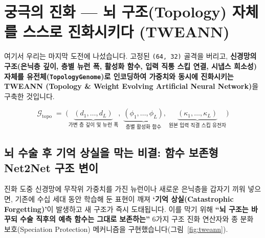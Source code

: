 \documentclass[11pt,a4paper]{article}
\begin{document}
\section{궁극의 진화 --- 뇌 구조(Topology) 자체를 스스로 진화시키다 (TWEANN)}

여기서 우리는 마지막 도전에 나섰습니다. 고정된 \texttt{(64, 32)} 골격을 버리고, \textbf{신경망의 구조(은닉층 깊이, 층별 뉴런 폭, 활성화 함수, 입력 직통 스킵 연결, 시냅스 희소성) 자체를 유전체(\texttt{TopologyGenome})로 인코딩하여 가중치와 동시에 진화시키는 TWEANN (Topology \& Weight Evolving Artificial Neural Network)}을 구축한 것입니다.

\begin{equation}
  \mathcal{G}_{\text{topo}} \;=\; \Big(\underbrace{(d_1, \dots, d_L)}_{\text{가변 층 깊이 및 뉴런 폭}},\; \underbrace{(\phi_1, \dots, \phi_L)}_{\text{층별 활성화 함수}},\; \underbrace{(\kappa_1, \dots, \kappa_L)}_{\text{원본 입력 직결 스킵 유전자}}\Big)
\end{equation}

\subsection{뇌 수술 후 기억 상실을 막는 비결: 함수 보존형 Net2Net 구조 변이}

진화 도중 신경망에 무작위 가중치를 가진 뉴런이나 새로운 은닉층을 갑자기 끼워 넣으면, 기존에 수십 세대 동안 학습해 둔 표현이 깨져 \textbf{`기억 상실(Catastrophic Forgetting)'}이 발생하고 새 구조가 즉시 도태됩니다. 이를 막기 위해 \textbf{``뇌 구조는 바꾸되 수술 직후의 예측 함수는 그대로 보존하는''} 6가지 구조 진화 연산자와 종 분화 보호(Speciation Protection) 메커니즘을 구현했습니다(그림~\ref{fig:tweann}).
\end{document}
